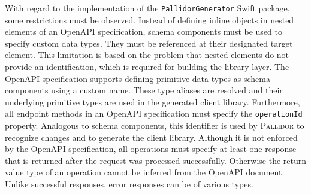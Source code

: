 With regard to the implementation of the \texttt{PallidorGenerator} Swift package, some restrictions must be observed. Instead of defining inline objects in nested elements of an OpenAPI specification, schema components must be used to specify custom data types. They must be referenced at their designated target element. This limitation is based on the problem that nested elements do not provide an identification, which is required for building the library layer. The Open\-API specification supports defining primitive data types as schema components using a custom name. These type aliases are resolved and their underlying primitive types are used in the generated client library. Furthermore, all endpoint methods in an Open\-API specification must specify the \texttt{operationId} property. Analogous to schema components, this identifier is used by \textsc{Pallidor} to recognize changes and to generate the client library. Although it is not enforced by the OpenAPI specification, all operations must specify at least one response that is returned after the request was processed successfully. Otherwise the return value type of an operation cannot be inferred from the Open\-API document. Unlike successful responses, error responses can be of various types.